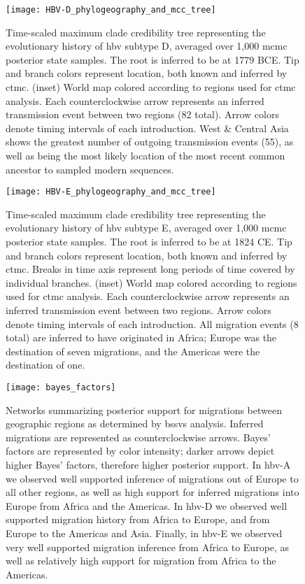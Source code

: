 \begin{figure}[ht]
  \centering
  \medskip
  \texttt{[image: HBV-D\_phylogeography\_and\_mcc\_tree]}
  \caption[HBV-D Phylogeography]{Time-scaled maximum clade credibility tree representing the evolutionary history of \gls{hbv} subtype D, averaged over 1,000 \gls{mcmc} posterior state samples. The root is inferred to be at 1779 BCE. Tip and branch colors represent location, both known and inferred by \gls{ctmc}. (inset) World map colored according to regions used for \gls{ctmc} analysis. Each counterclockwise arrow represents an inferred transmission event between two regions (82 total). Arrow colors denote timing intervals of each introduction. West \& Central Asia shows the greatest number of outgoing transmission events (55), as well as being the most likely location of the most recent common ancestor to sampled modern sequences.}
  \label{fig:HBV-D_phylogeo}
\end{figure}

\begin{figure}[ht]
  \centering
  \medskip
  \texttt{[image: HBV-E\_phylogeography\_and\_mcc\_tree]}
  \caption[HBV-E Phylogeography]{Time-scaled maximum clade credibility tree representing the evolutionary history of \gls{hbv} subtype E, averaged over 1,000 \gls{mcmc} posterior state samples. The root is inferred to be at 1824 CE. Tip and branch colors represent location, both known and inferred by \gls{ctmc}. Breaks in time axis represent long periods of time covered by individual branches. (inset) World map colored according to regions used for \gls{ctmc} analysis. Each counterclockwise arrow represents an inferred transmission event between two regions. Arrow colors denote timing intervals of each introduction. All migration events (8 total) are inferred to have originated in Africa; Europe was the destination of seven migrations, and the Americas were the destination of one.}
  \label{fig:HBV-E_phylogeo}
\end{figure}

\begin{figure}[ht]
  \centering
  \medskip
  \texttt{[image: bayes\_factors]}
  \caption[Bayes' factors of \gls{hbv} geographic transitions]{Networks summarizing posterior support for migrations between geographic regions as determined by \gls{bssvs} analysis. Inferred migrations are represented as counterclockwise arrows. Bayes' factors are represented by color intensity; darker arrows depict higher Bayes' factors, therefore higher posterior support. In \gls{hbv}-A we observed well supported inference of migrations out of Europe to all other regions, as well as high support for inferred migrations into Europe from Africa and the Americas. In \gls{hbv}-D we observed well supported migration history from Africa to Europe, and from Europe to the Americas and Asia. Finally, in \gls{hbv}-E we observed very well supported migration inference from Africa to Europe, as well as relatively high support for migration from Africa to the Americas.}
  \label{fig:bayes_factors}
\end{figure}

